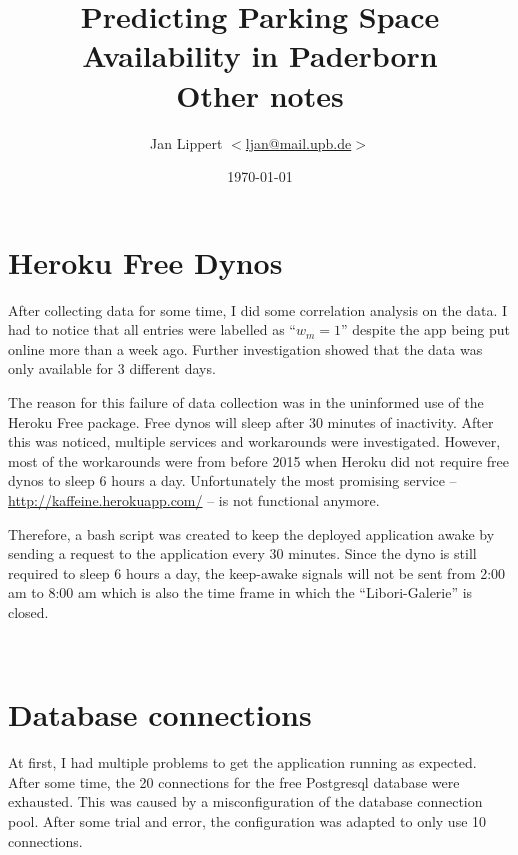 \documentclass[journal,10pt]{IEEEtran}
\title{Predicting Parking Space Availability in Paderborn\\
Other notes}
\author{Jan Lippert \(<\)\href{mailt:ljan@mail.upb.de}{ljan@mail.upb.de}\(>\)}
\date{\today}
\newcommand{\wom}{w_m}
\begin{document}
\maketitle


\section{Heroku Free Dynos}
After collecting data for some time, I did some correlation analysis on the data. I had to notice that all entries were labelled as ``\(\wom = 1\)'' despite the app being put online more than a week ago. Further investigation showed that the data was only available for 3 different days. 

The reason for this failure of data collection was in the uninformed use of the Heroku Free package. Free dynos will sleep after 30 minutes of inactivity. After this was noticed, multiple services and workarounds were investigated. However, most of the workarounds were from before 2015 when Heroku did not require free dynos to sleep 6 hours a day. Unfortunately the most promising service -- \url{http://kaffeine.herokuapp.com/} -- is not functional anymore.

Therefore, a bash script was created to keep the deployed application awake by sending a request to the application every 30 minutes. Since the dyno is still required to sleep 6 hours a day, the keep-awake signals will not be sent from 2:00 am to 8:00 am which is also the time frame in which the ``Libori-Galerie'' is closed.

\
\section{Database connections}
At first, I had multiple problems to get the application running as expected. After some time, the 20 connections for the free Postgresql database were exhausted. This was caused by a misconfiguration of the database connection pool. After some trial and error, the configuration was adapted to only use 10 connections.

  
\end{document}

